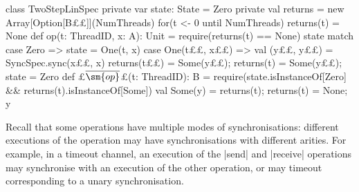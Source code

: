 \begin{trivlist}
\item[]
\begin{minipage}{92mm}
\begin{scala}
class TwoStepLinSpec{
  private var state: State = Zero
  private val returns = new Array[Option[B££]](NumThreads)
  for(t <- 0 until NumThreads) returns(t) = None
  def op(t: ThreadID, x: A): Unit = {
    require(returns(t) == None)
    state match{
      case Zero => state = One(t, x)
      case One(t££, x££) => 
        val (y££, y££) = SyncSpec.sync(x££, x) 
        returns(t££) = Some(y££); returns(t) = Some(y££); state = Zero
    }
  }
  def £$\overline{\sm{op}}$£(t: ThreadID): B = {
    require(state.isInstanceOf[Zero] && returns(t).isInstanceOf[Some])
    val Some(y) = returns(t); returns(t) = None; y
  }
}
\end{scala}
\end{minipage}
\hfill 
%
\begin{minipage}{37.8mm}
%
\vspace{40mm}
\end{minipage}%
\end{trivlist}




Recall that some operations have multiple modes of synchronisations: different
executions of the operation may have synchronisations with different arities.
For example, in a timeout channel, an execution of the |send| and |receive|
operations may synchronise with an execution of the other operation, or may
timeout corresponding to a unary synchronisation.
%

